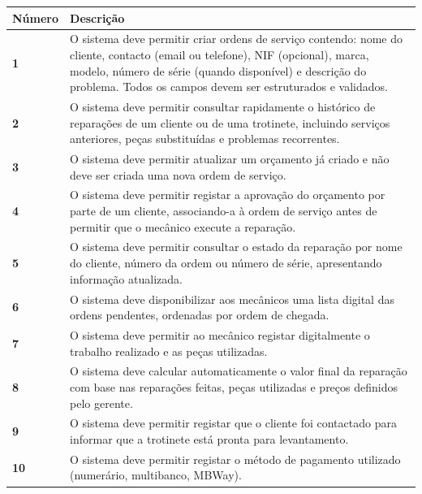 \documentclass[11pt,a4paper]{article}
\begin{document}
		\begin{tabularx}{\textwidth}{@{}|l|X|@{}}
			\hline
			\rowcolor{gray!10} \textbf{Número} & \textbf{Descrição} \\ \hline
			\textbf{1} &  O sistema deve permitir criar ordens de serviço contendo: nome do cliente, contacto (email ou telefone), NIF (opcional), marca, modelo, número de série (quando disponível) e descrição do problema. Todos os campos devem ser estruturados e validados. \\ \hline
			\textbf{2} &  O sistema deve permitir consultar rapidamente o histórico de reparações de um cliente ou de uma trotinete, incluindo serviços anteriores, peças substituídas e problemas recorrentes. \\ \hline
			\textbf{3} &  O sistema deve permitir atualizar um orçamento já criado e não deve ser criada uma nova ordem de serviço. \\ \hline
			\textbf{4} &  O sistema deve permitir registar a aprovação do orçamento por parte de um cliente, associando-a à ordem de serviço antes de permitir que o mecânico execute a reparação.  \\ \hline
			\textbf{5} & O sistema deve permitir consultar o estado da reparação por nome do cliente, número da ordem ou número de série, apresentando informação atualizada. \\ \hline
			\textbf{6} &  O sistema deve disponibilizar aos mecânicos uma lista digital das ordens pendentes, ordenadas por ordem de chegada. \\ \hline
			\textbf{7} &  O sistema deve permitir ao mecânico registar digitalmente o trabalho realizado e as peças utilizadas. \\ \hline
			\textbf{8} &   O sistema deve calcular automaticamente o valor final da reparação com base nas reparações feitas, peças utilizadas e preços definidos pelo gerente. \\ \hline
			\textbf{9} &  O sistema deve permitir registar que o cliente foi contactado para informar que a trotinete está pronta para levantamento. \\ \hline
			\textbf{10} &  O sistema deve permitir registar o método de pagamento utilizado (numerário, multibanco, MBWay).  \\ \hline
		\end{tabularx}
	
\end{document}
